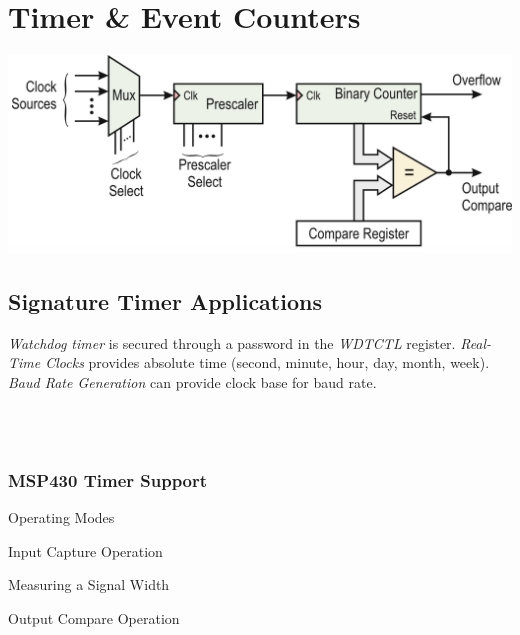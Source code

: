 \section{Timer \& Event Counters }
\includegraphics[width=\columnwidth]{"Images/TimerFuntionsweise.png"}

\subsection{Signature Timer Applications }
\textit{Watchdog timer} is secured through a password in the \textit{WDTCTL} register.
\textit{Real-Time Clocks} provides absolute time (second, minute, hour, day, month, week).
\textit{Baud Rate Generation} can provide clock base for baud rate.

\begin{minipage}{.5\columnwidth}
\end{minipage}
\begin{minipage}{.5\columnwidth}
	\\
	\\
\end{minipage}

\subsubsection{MSP430 Timer Support }

Operating Modes

Input Capture Operation

Measuring a Signal Width

Output Compare Operation